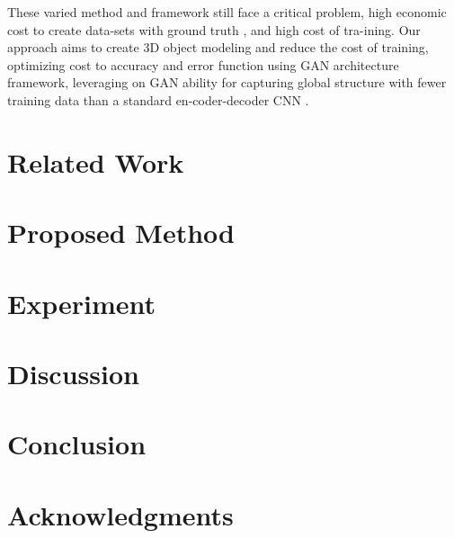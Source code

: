 \documentclass[a4paper,12pt]{article}
\begin{document}
These varied method and framework still face a critical problem, 
high economic cost to create data-sets with ground truth \cite{zhao101007}, and high cost of tra-ining.
Our approach aims to create 3D object modeling and reduce the cost of training, optimizing cost to accuracy and error function using GAN architecture framework, 
leveraging on GAN ability for capturing global structure with fewer training data than a standard en-coder-decoder CNN \cite{hendra10113647}.

\section{Related Work}

\section{Proposed Method}

\section{Experiment}

\section{Discussion}

\section{Conclusion}

\section{Acknowledgments}



\end{document}
